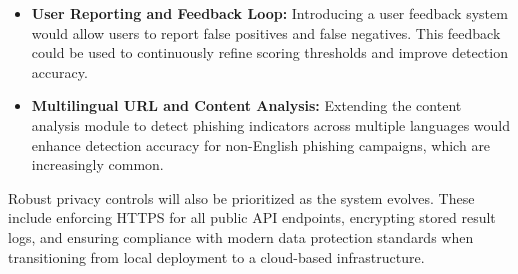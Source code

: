 \begin{itemize}
\item \textbf{User Reporting and Feedback Loop:}  
Introducing a user feedback system would allow users to report false positives and false negatives. This feedback could be used to continuously refine scoring thresholds and improve detection accuracy.

\item \textbf{Multilingual URL and Content Analysis:}  
Extending the content analysis module to detect phishing indicators across multiple languages would enhance detection accuracy for non-English phishing campaigns, which are increasingly common.

\end{itemize}

Robust privacy controls will also be prioritized as the system evolves. These include enforcing HTTPS for all public API endpoints, encrypting stored result logs, and ensuring compliance with modern data protection standards when transitioning from local deployment to a cloud-based infrastructure.